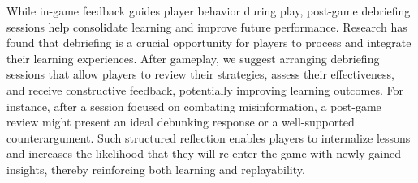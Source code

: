 While in-game feedback guides player behavior during play, post-game debriefing sessions help consolidate learning and improve future performance. Research has found that debriefing is a crucial opportunity for players to process and integrate their learning experiences\cite{crookall2014engaging,leder2024feedback,barzilai2024learning}. After gameplay, we suggest arranging debriefing sessions that allow players to review their strategies, assess their effectiveness, and receive constructive feedback, potentially improving learning outcomes. For instance, after a session focused on combating misinformation, a post-game review might present an ideal debunking response or a well-supported counterargument. Such structured reflection enables players to internalize lessons and increases the likelihood that they will re-enter the game with newly gained insights, thereby reinforcing both learning and replayability.

